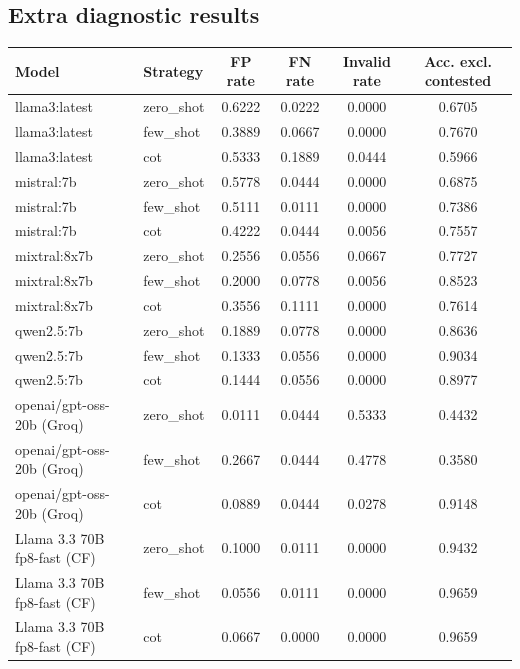 \documentclass[11pt, a4paper]{article}
\begin{document}
\subsection*{\color{bambergnavy} Extra diagnostic results}
\begin{table}[htbp]
\centering
\scriptsize
\setlength{\tabcolsep}{5pt}
\renewcommand{\arraystretch}{1.2}
\begin{tabularx}{\textwidth}{>{\raggedright\arraybackslash}X l c c c c}
\toprule
\rowcolor{labeltint}
\textbf{Model} & \textbf{Strategy} & \textbf{FP rate} & \textbf{FN rate} & \textbf{Invalid rate} & \textbf{Acc. excl. contested} \\
\midrule
llama3:latest & zero\_shot & 0.6222 & 0.0222 & 0.0000 & 0.6705 \\
llama3:latest & few\_shot & 0.3889 & 0.0667 & 0.0000 & 0.7670 \\
llama3:latest & cot & 0.5333 & 0.1889 & 0.0444 & 0.5966 \\
\midrule
mistral:7b & zero\_shot & 0.5778 & 0.0444 & 0.0000 & 0.6875 \\
mistral:7b & few\_shot & 0.5111 & 0.0111 & 0.0000 & 0.7386 \\
mistral:7b & cot & 0.4222 & 0.0444 & 0.0056 & 0.7557 \\
\midrule
mixtral:8x7b & zero\_shot & 0.2556 & 0.0556 & 0.0667 & 0.7727 \\
mixtral:8x7b & few\_shot & 0.2000 & 0.0778 & 0.0056 & 0.8523 \\
mixtral:8x7b & cot & 0.3556 & 0.1111 & 0.0000 & 0.7614 \\
\midrule
qwen2.5:7b & zero\_shot & 0.1889 & 0.0778 & 0.0000 & 0.8636 \\
qwen2.5:7b & few\_shot & 0.1333 & 0.0556 & 0.0000 & 0.9034 \\
qwen2.5:7b & cot & 0.1444 & 0.0556 & 0.0000 & 0.8977 \\
\midrule
openai/gpt-oss-20b (Groq) & zero\_shot & 0.0111 & 0.0444 & 0.5333 & 0.4432 \\
openai/gpt-oss-20b (Groq) & few\_shot & 0.2667 & 0.0444 & 0.4778 & 0.3580 \\
openai/gpt-oss-20b (Groq) & cot & 0.0889 & 0.0444 & 0.0278 & 0.9148 \\
\midrule
Llama 3.3 70B fp8-fast (CF) & zero\_shot & 0.1000 & 0.0111 & 0.0000 & 0.9432 \\
Llama 3.3 70B fp8-fast (CF) & few\_shot & 0.0556 & 0.0111 & 0.0000 & 0.9659 \\
Llama 3.3 70B fp8-fast (CF) & cot & 0.0667 & 0.0000 & 0.0000 & 0.9659 \\
\bottomrule
\end{tabularx}
\end{table}
\end{document}

